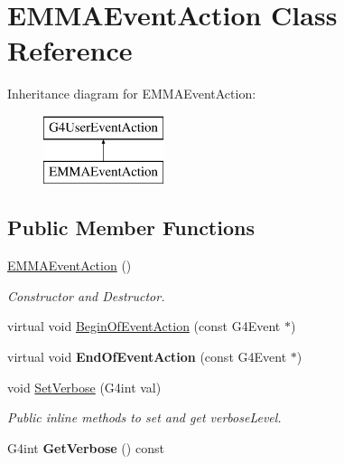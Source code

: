 \hypertarget{classEMMAEventAction}{\section{E\-M\-M\-A\-Event\-Action Class Reference}
\label{classEMMAEventAction}
}
Inheritance diagram for E\-M\-M\-A\-Event\-Action\-:\begin{figure}[H]
\begin{center}
\leavevmode
\includegraphics[height=2.000000cm]{classEMMAEventAction}
\end{center}
\end{figure}
\subsection*{Public Member Functions}
\begin{DoxyCompactItemize}
\item 
\hypertarget{classEMMAEventAction_a9ec3d8551ce151116aa9c07052e69028}{\hyperlink{classEMMAEventAction_a9ec3d8551ce151116aa9c07052e69028}{E\-M\-M\-A\-Event\-Action} ()}\label{classEMMAEventAction_a9ec3d8551ce151116aa9c07052e69028}

\begin{DoxyCompactList}\small\item\em Constructor and Destructor. \end{DoxyCompactList}\item 
virtual void \hyperlink{classEMMAEventAction_a6ab354bf5a5681df885c3c2e8c12ce4c}{Begin\-Of\-Event\-Action} (const G4\-Event $\ast$)
\item 
\hypertarget{classEMMAEventAction_a7bb0e43b3b5fed097b3793d02b770a77}{virtual void {\bfseries End\-Of\-Event\-Action} (const G4\-Event $\ast$)}\label{classEMMAEventAction_a7bb0e43b3b5fed097b3793d02b770a77}

\item 
\hypertarget{classEMMAEventAction_a485516c062bf57a484257f5e39f0cc75}{void \hyperlink{classEMMAEventAction_a485516c062bf57a484257f5e39f0cc75}{Set\-Verbose} (G4int val)}\label{classEMMAEventAction_a485516c062bf57a484257f5e39f0cc75}

\begin{DoxyCompactList}\small\item\em Public inline methods to set and get verbose\-Level. \end{DoxyCompactList}\item 
\hypertarget{classEMMAEventAction_a535d896eb451ec43f103ca54d0306899}{G4int {\bfseries Get\-Verbose} () const }\label{classEMMAEventAction_a535d896eb451ec43f103ca54d0306899}

\end{DoxyCompactItemize}


